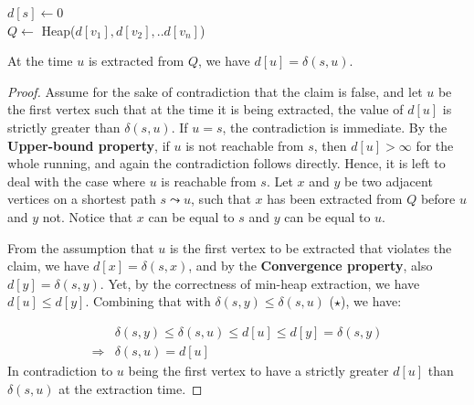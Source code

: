   \begin{algorithm}[h]
    $d[s] \leftarrow 0 $\\
    $Q \leftarrow $ Heap($d[v_{1}], d[v_{2}], .. d[v_{n}]$)\\
    \caption{Dijkstra.}
    \label{alg:dijkstra}
  \end{algorithm}

  \begin{claim}
At the time $u$ is extracted from $Q$, we have $d[u] = \delta(s,u)$.
  \end{claim}
  \begin{proof}
Assume for the sake of contradiction that the claim is false, and let $u$ be the first vertex such that at the time it is being extracted, the value of $d[u]$ is strictly greater than $\delta(s,u)$. If $u=s$, the contradiction is immediate. By the \textbf{Upper-bound property}, if $u$ is not reachable from $s$, then $d[u] > \infty$ for the whole running, and again the contradiction follows directly. Hence, it is left to deal with the case where $u$ is reachable from $s$. Let $x$ and $y$ be two adjacent vertices on a shortest path $s \leadsto u$, such that $x$ has been extracted from $Q$ before $u$ and $y$ not. Notice that $x$ can be equal to $s$ and $y$ can be equal to $u$.


From the assumption that $u$ is the first vertex to be extracted that violates the claim, we have $d[x]=\delta(s,x)$, and by the \textbf{Convergence property}, also $d[y] = \delta(s,y)$. Yet, by the correctness of min-heap extraction, we have $d[u] \le d[y]$. Combining that with $\delta(s,y) \le \delta(s,u)$ ($\star$), we have:
    
    \begin{equation*}
      \begin{split}
        & \delta(s,y) \le \delta(s,u) \le d[u] \le d[y] = \delta(s,y)\\ 
        \Rightarrow & \delta(s,u) = d[u]
      \end{split}
    \end{equation*}
In contradiction to $u$ being the first vertex to have a strictly greater $d[u]$ than $\delta(s,u)$ at the extraction time.
  \end{proof}


